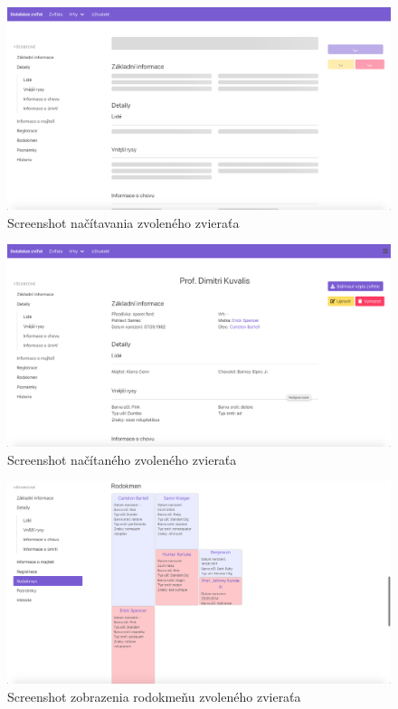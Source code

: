 \begin{figure}[H]
	\includegraphics[width=1.0\textwidth]{media/priloha/zviera/1.png}
	\caption{Screenshot načítavania zvoleného zvieraťa}
\end{figure}

\begin{figure}[H]
	\includegraphics[width=1.0\textwidth]{media/priloha/zviera/2.png}
	\caption{Screenshot načítaného zvoleného zvieraťa}
\end{figure}

\begin{figure}[H]
	\includegraphics[width=1.0\textwidth]{media/priloha/zviera/3.png}
	\caption{Screenshot zobrazenia rodokmeňu zvoleného zvieraťa}
\end{figure}

